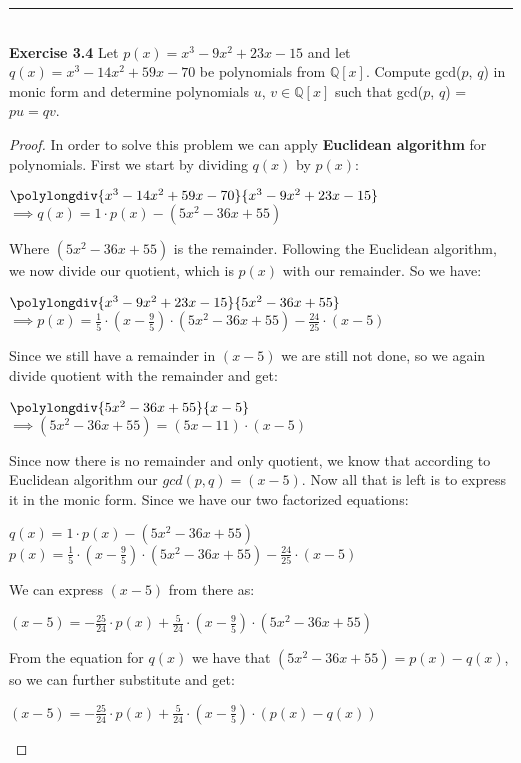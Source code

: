\documentclass[a4paper]{article}
\begin{document}
\noindent\rule{12cm}{0.4pt}\\
\noindent \textbf{Exercise 3.4} Let $p(x) = x^3 - 9x^2 + 23x - 15$ and let $q(x) = x^3 - 14x^2 + 59x - 70$ be polynomials from $\mathbb{Q}[x]$. Compute gcd($p$, $q$) in monic form and determine polynomials $u$, $v \in \mathbb{Q}[x]$ such that gcd($p$, $q$) = $pu = qv$.
\begin{proof}
In order to solve this problem we can apply \textbf{Euclidean algorithm} for polynomials. First we start by dividing $q(x)$ by $p(x)$:
\begin{center}
$\polylongdiv{x^3 - 14x^2 + 59x - 70}{x^3 - 9x^2 + 23x - 15}$\\
$\implies q(x) = 1 \cdot p(x) - (5x^2 - 36x + 55)$
\end{center}
Where $(5x^2 - 36x + 55)$ is the remainder. Following the Euclidean algorithm, we now divide our quotient, which is $p(x)$ with our remainder. So we have:
\begin{center}
$\polylongdiv{x^3 - 9x^2 + 23x - 15}{5x^2 - 36x + 55}$\\
$ \implies p(x) = \frac{1}{5} \cdot (x - \frac{9}{5}) \cdot (5x^2 - 36x + 55) - \frac{24}{25} \cdot (x-5)$
\end{center}
Since we still have a remainder in $(x-5)$ we are still not done, so we again divide quotient with the remainder and get:
\begin{center}
$\polylongdiv{5x^2 - 36x + 55}{x-5}$\\
$\implies (5x^2 - 36x + 55) = (5x - 11) \cdot (x-5)$
\end{center}
Since now there is no remainder and only quotient, we know that according to Euclidean algorithm our $gcd(p,q)= (x-5)$. Now all that is left is to express it in the monic form. Since we have our two factorized equations:
\begin{center}
$q(x) = 1 \cdot p(x) - (5x^2 - 36x + 55)$\\
$p(x) = \frac{1}{5} \cdot (x - \frac{9}{5}) \cdot (5x^2 - 36x + 55) - \frac{24}{25} \cdot (x-5)$
\end{center}
We can express $(x-5)$ from there as:
\begin{center}
$(x-5) = -\frac{25}{24}  \cdot p(x) + \frac{5}{24} \cdot (x - \frac{9}{5}) \cdot (5x^2 - 36x + 55)$	
\end{center}
From the equation for $q(x)$ we have that $(5x^2 - 36x + 55) = p(x) - q(x)$, so we can further substitute and get:
\begin{center}
$(x-5) = -\frac{25}{24} \cdot p(x) + \frac{5}{24} \cdot (x - \frac{9}{5}) \cdot (p(x)-q(x))$\\

\end{center}
\end{proof}
\end{document}
